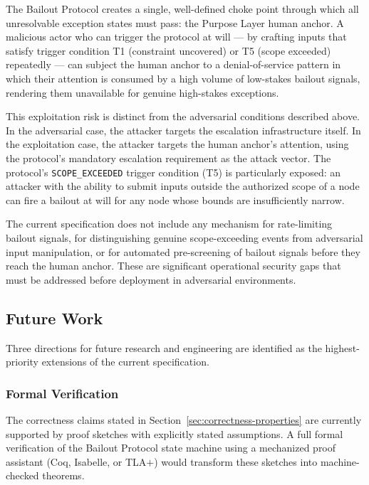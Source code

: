The Bailout Protocol creates a single, well-defined choke point through which all unresolvable exception states must pass: the Purpose Layer human anchor. A malicious actor who can trigger the protocol at will --- by crafting inputs that satisfy trigger condition T1 (constraint uncovered) or T5 (scope exceeded) repeatedly --- can subject the human anchor to a denial-of-service pattern in which their attention is consumed by a high volume of low-stakes bailout signals, rendering them unavailable for genuine high-stakes exceptions.

This exploitation risk is distinct from the adversarial conditions described above. In the adversarial case, the attacker targets the escalation infrastructure itself. In the exploitation case, the attacker targets the human anchor's attention, using the protocol's mandatory escalation requirement as the attack vector. The protocol's \texttt{SCOPE\_EXCEEDED} trigger condition (T5) is particularly exposed: an attacker with the ability to submit inputs outside the authorized scope of a node can fire a bailout at will for any node whose bounds are insufficiently narrow.

The current specification does not include any mechanism for rate-limiting bailout signals, for distinguishing genuine scope-exceeding events from adversarial input manipulation, or for automated pre-screening of bailout signals before they reach the human anchor. These are significant operational security gaps that must be addressed before deployment in adversarial environments.

\subsection{Future Work}\label{sec:future-work}

Three directions for future research and engineering are identified as the highest-priority extensions of the current specification.

\subsubsection{Formal Verification}\label{sec:formal-verification}

The correctness claims stated in Section~\ref{sec:correctness-properties} are currently supported by proof sketches with explicitly stated assumptions. A full formal verification of the Bailout Protocol state machine using a mechanized proof assistant (Coq, Isabelle, or TLA$+$) would transform these sketches into machine-checked theorems.

